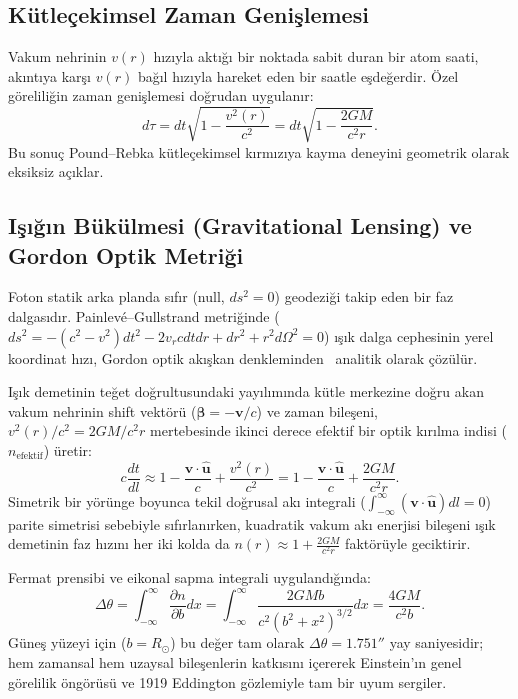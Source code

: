 \documentclass[11pt,a4paper]{article}
\begin{document}
\subsection{Kütleçekimsel Zaman Genişlemesi}
Vakum nehrinin $v(r)$ hızıyla aktığı bir noktada sabit duran bir atom saati, akıntıya karşı $v(r)$ bağıl hızıyla hareket eden bir saatle eşdeğerdir. Özel göreliliğin zaman genişlemesi doğrudan uygulanır:
\begin{equation}
    d\tau = dt \sqrt{1 - \frac{v^2(r)}{c^2}} = dt \sqrt{1 - \frac{2GM}{c^2 r}}.
    \label{eq:zaman_genislemesi}
\end{equation}
Bu sonuç Pound--Rebka kütleçekimsel kırmızıya kayma deneyini geometrik olarak eksiksiz açıklar.

\subsection{Işığın Bükülmesi (Gravitational Lensing) ve Gordon Optik Metriği}
Foton statik arka planda sıfır (null, $ds^2 = 0$) geodeziği takip eden bir faz dalgasıdır. Painlev\'e--Gullstrand metriğinde ($ds^2 = -(c^2 - v^2) dt^2 - 2v_r c dt dr + dr^2 + r^2 d\Omega^2 = 0$) ışık dalga cephesinin yerel koordinat hızı, Gordon optik akışkan denkleminden~\cite{hamilton2008} analitik olarak çözülür.

Işık demetinin teğet doğrultusundaki yayılımında kütle merkezine doğru akan vakum nehrinin shift vektörü ($\boldsymbol{\beta} = -\mathbf{v}/c$) ve zaman bileşeni, $v^2(r)/c^2 = 2GM/c^2 r$ mertebesinde ikinci derece efektif bir optik kırılma indisi ($n_{\mathrm{efektif}}$) üretir:
\begin{equation}
    c \frac{dt}{dl} \approx 1 - \frac{\mathbf{v} \cdot \hat{\mathbf{u}}}{c} + \frac{v^2(r)}{c^2} = 1 - \frac{\mathbf{v} \cdot \hat{\mathbf{u}}}{c} + \frac{2GM}{c^2 r}.
    \label{eq:kirilma_indisi_pg}
\end{equation}
Simetrik bir yörünge boyunca tekil doğrusal akı integrali ($\int_{-\infty}^{\infty} (\mathbf{v} \cdot \hat{\mathbf{u}}) dl = 0$) parite simetrisi sebebiyle sıfırlanırken, kuadratik vakum akı enerjisi bileşeni ışık demetinin faz hızını her iki kolda da $n(r) \approx 1 + \frac{2GM}{c^2 r}$ faktörüyle geciktirir.

Fermat prensibi ve eikonal sapma integrali uygulandığında:
\begin{equation}
    \Delta \theta = \int_{-\infty}^{\infty} \frac{\partial n}{\partial b} dx = \int_{-\infty}^{\infty} \frac{2GM b}{c^2 (b^2 + x^2)^{3/2}} dx = \frac{4GM}{c^2 b}.
    \label{eq:sapma_ispat}
\end{equation}
Güneş yüzeyi için ($b = R_\odot$) bu değer tam olarak $\Delta \theta = 1.751''$ yay saniyesidir; hem zamansal hem uzaysal bileşenlerin katkısını içererek Einstein'ın genel görelilik öngörüsü ve 1919 Eddington gözlemiyle tam bir uyum sergiler.
\end{document}

